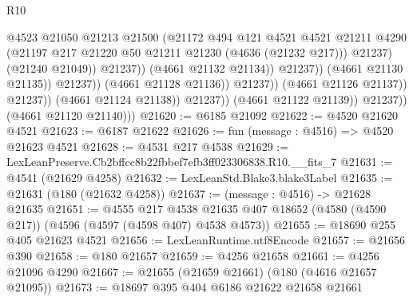 \begin{lexlean}{R10}
\begin{coremodule}
                                                  @4523
                                                  @21050
                                                  @21213
                                                  @21500
                                                  (@21172
                                                    @494
                                                    @121
                                                    @4521
                                                    @4521
                                                    @21211
                                                    @4290
                                                    (@21197
                                                      @217
                                                      @21220
                                                      @50
                                                      @21211
                                                      @21230
                                                      (@4636 (@21232 @217)))
                                                    @21237)
                                                  (@21240 @21049))
                                                @21237))
                                            (@4661 @21132 @21134))
                                          @21237))
                                      (@4661 @21130 @21135))
                                    @21237))
                                (@4661 @21128 @21136))
                              @21237))
                          (@4661 @21126 @21137))
                        @21237))
                    (@4661 @21124 @21138))
                  @21237))
              (@4661 @21122 @21139))
            @21237))
        (@4661 @21120 @21140)))
@21620 := @6185 @21092
@21622 := @4520 @21620 @4521
@21623 := @6187 @21622
@21626 := fun (message : @4516) => @4520 @21623 @4521
@21628 := @4531 @217 @4538
@21629 := LexLeanPreserve.Cb2bffcc8b22fbbef7efb3ff023306838.R10.__fits_7
@21631 := @4541 (@21629 @4258)
@21632 := LexLeanStd.Blake3.blake3Label
@21635 := @21631 (@180 (@21632 @4258))
@21637 := (message : @4516) -> @21628 @21635
@21651 := @4555
    @217
    @4538
    @21635
    @407
    @18652
    (@4580 (@4590 @217))
    (@4596 (@4597 (@4598 @407) @4538 @4573))
@21655 := @18690 @255 @405 @21623 @4521
@21656 := LexLeanRuntime.utf8Encode
@21657 := @21656 @390
@21658 := @180 @21657
@21659 := @4256 @21658
@21661 := @4256 @21096 @4290
@21667 := @21655 (@21659 @21661) (@180 (@4616 @21657 @21095))
@21673 := @18697 @395 @404 @6186 @21622 @21658 @21661

\end{coremodule}
\end{lexlean}
